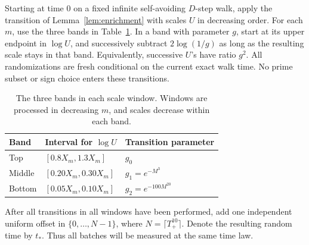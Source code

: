 Starting at time \(0\) on a fixed infinite self-avoiding \(D\)-step
walk, apply the transition of Lemma~\ref{lem:enrichment} with scales
\(U\) in decreasing order. For each \(m\), use the three bands
in Table~\ref{tab:bands}. In a band with parameter \(g\), start at its
upper endpoint in \(\log U\), and successively subtract
\(2\log(1/g)\) as long as the resulting scale stays in that band.
Equivalently, successive \(U\)'s have ratio \(g^2\).
All randomizations are fresh conditional on the current exact walk time.
No prime subset or sign choice enters these transitions.

\begin{table}[ht]
\centering
\begin{tabular}{lll}
\toprule
Band & Interval for \(\log U\) & Transition parameter\\
\midrule
Top & \([0.8X_m,1.3X_m]\) & \(g_0\)\\
Middle & \([0.20X_m,0.30X_m]\) & \(g_1=e^{-M^3}\)\\
Bottom & \([0.05X_m,0.10X_m]\) & \(g_2=e^{-100M^{20}}\)\\
\bottomrule
\end{tabular}
\caption{The three bands in each scale window. Windows are processed
in decreasing \(m\), and scales decrease within each band.}
\label{tab:bands}
\end{table}

After all transitions in all windows have been performed, add one
independent uniform offset in \(\{0,\ldots,N-1\}\), where
\(N=\lceil T_+^{10}\rceil\).
Denote the resulting random time by \(t_*\).
Thus all batches will be measured at the same time law.


